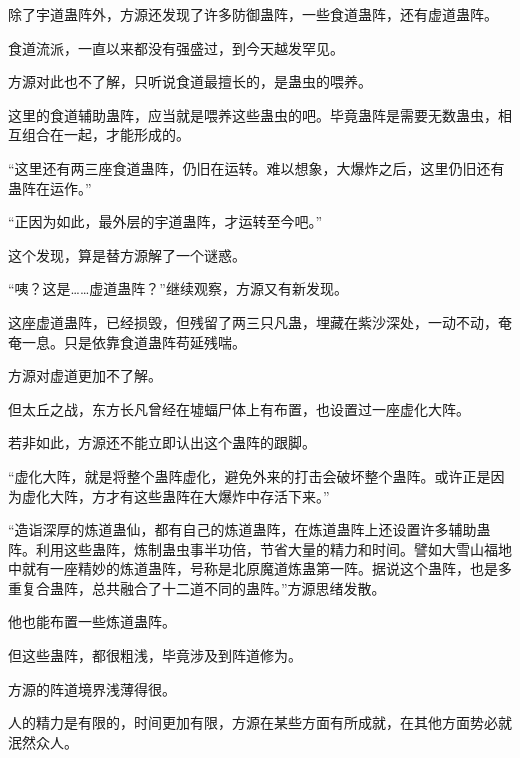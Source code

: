 \begin{this_body}
除了宇道蛊阵外，方源还发现了许多防御蛊阵，一些食道蛊阵，还有虚道蛊阵。

食道流派，一直以来都没有强盛过，到今天越发罕见。

方源对此也不了解，只听说食道最擅长的，是蛊虫的喂养。

这里的食道辅助蛊阵，应当就是喂养这些蛊虫的吧。毕竟蛊阵是需要无数蛊虫，相互组合在一起，才能形成的。

“这里还有两三座食道蛊阵，仍旧在运转。难以想象，大爆炸之后，这里仍旧还有蛊阵在运作。”

“正因为如此，最外层的宇道蛊阵，才运转至今吧。”

这个发现，算是替方源解了一个谜惑。

“咦？这是……虚道蛊阵？”继续观察，方源又有新发现。

这座虚道蛊阵，已经损毁，但残留了两三只凡蛊，埋藏在紫沙深处，一动不动，奄奄一息。只是依靠食道蛊阵苟延残喘。

方源对虚道更加不了解。

但太丘之战，东方长凡曾经在墟蝠尸体上有布置，也设置过一座虚化大阵。

若非如此，方源还不能立即认出这个蛊阵的跟脚。

“虚化大阵，就是将整个蛊阵虚化，避免外来的打击会破坏整个蛊阵。或许正是因为虚化大阵，方才有这些蛊阵在大爆炸中存活下来。”

“造诣深厚的炼道蛊仙，都有自己的炼道蛊阵，在炼道蛊阵上还设置许多辅助蛊阵。利用这些蛊阵，炼制蛊虫事半功倍，节省大量的精力和时间。譬如大雪山福地中就有一座精妙的炼道蛊阵，号称是北原魔道炼蛊第一阵。据说这个蛊阵，也是多重复合蛊阵，总共融合了十二道不同的蛊阵。”方源思绪发散。

他也能布置一些炼道蛊阵。

但这些蛊阵，都很粗浅，毕竟涉及到阵道修为。

方源的阵道境界浅薄得很。

人的精力是有限的，时间更加有限，方源在某些方面有所成就，在其他方面势必就泯然众人。

\end{this_body}

